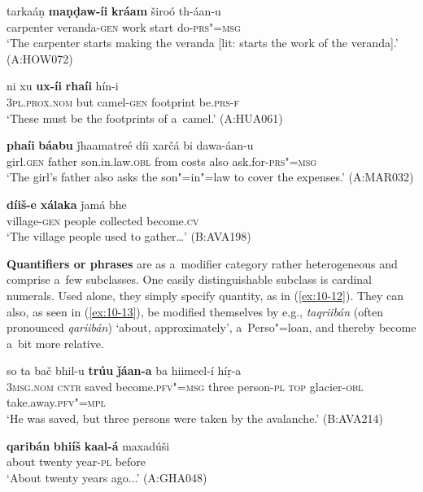 \begin{exe}
\ex
\label{ex:10-8}
\gll tarkaáṇ \textbf{maṇḍaw-íi} \textbf{kráam} široó th-áan-u  \\
carpenter veranda-\textsc{gen} work start do-\textsc{prs"=msg} \\
\glt `The carpenter starts making the veranda [lit: starts the work of the veranda].' (A:HOW072)

\ex
\label{ex:10-9}
\gll ni xu \textbf{ux-íi} \textbf{rhaíi} hín-i \\
\textsc{3pl.prox.nom} but camel-\textsc{gen} footprint be.\textsc{prs-f}  \\
\glt `These must be the footprints of a~camel.' (A:HUA061)

\ex
\label{ex:10-10}
\gll \textbf{phaíi} \textbf{báabu} ǰhaamatreé díi xarčá bi dawa-áan-u \\
girl.\textsc{gen} father son.in.law.\textsc{obl} from costs also ask.for-\textsc{prs"=msg} \\
\glt `The girl's father also asks the son"=in"=law to cover the expenses.' (A:MAR032)

\ex
\label{ex:10-11}
\gll \textbf{díiš-e} \textbf{xálaka} ǰamá bhe \\
village-\textsc{gen} people collected become.\textsc{cv} \\
\glt `The village people used to gather{\ldots}' (B:AVA198)
\end{exe}


\textbf{Quantifiers or  phrases} are as a~modifier category rather heterogeneous and comprise a~few subclasses. One easily distinguishable subclass is cardinal numerals. Used alone, they simply specify quantity, as in (\ref{ex:10-12}). They can also, as seen in (\ref{ex:10-13}), be modified themselves by e.g., \textit{taqriibán} (often pronounced \textit{qariibán}) `about, approximately', a~Perso"=\iliArabic loan, and thereby become a~bit more relative.

\begin{exe}
\ex
\label{ex:10-12}
\gll so ta bač bhil-u \textbf{trúu} \textbf{ǰáan-a} ba hiimeel-í híṛ-a  \\
\textsc{3msg.nom} \textsc{cntr} saved become.\textsc{pfv"=msg} three  person-\textsc{pl} \textsc{top} glacier-\textsc{obl} take.away.\textsc{pfv"=mpl} \\
\glt `He was saved, but three persons were taken by the avalanche.' (B:AVA214)

\ex
\label{ex:10-13}
\gll \textbf{qaribán} \textbf{bhiíš} \textbf{kaal-á} maxadúši  \\
about twenty year-\textsc{pl} before \\
\glt `About twenty years ago...' (A:GHA048)
\end{exe}


